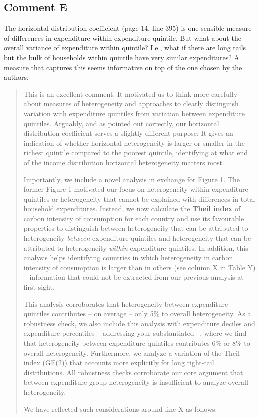 \documentclass[11pt]{article}
\newenvironment{response}
{\begin{quote}\color{black}}
{\end{quote}}
\begin{document}
\subsection*{Comment E}\label{comment_R1_E}

\begin{commentbox}
    The horizontal distribution coefficient (page 14, line 395) is one sensible measure of differences in expenditure within expenditure quintile. But what about the overall variance of expenditure within quintile? I.e., what if there are long tails but the bulk of households within quintile have very similar expenditures? A measure that captures this seems informative on top of the one chosen by the authors.
\end{commentbox}

\begin{response}

This is an excellent comment. It motivated us to think more carefully about measures of heterogeneity and approaches to clearly distinguish variation with expenditure quintiles from variation between expenditure quintiles. Arguably, and as pointed out correctly, our horizontal distribution coefficient serves a slightly different purpose: It gives an indication of whether horizontal heterogeneity is larger or smaller in the richest quintile compared to the poorest quintile, identifying at what end of the income distribution horizontal heterogeneity matters most.

Importantly, we include a novel analysis in exchange for Figure 1. The former Figure 1 motivated our focus on heterogeneity within expenditure quintiles or heterogeneity that cannot be explained with differences in total household expenditures. Instead, we now calculate the \textbf{Theil index} of carbon intensity of consumption for each country and use its favourable properties to distinguish between heterogeneity that can be attributed to heterogeneity \textit{between} expenditure quintiles and heterogeneity that can be attributed to heterogeneity \textit{within} expenditure quintiles. In addition, this analysis helps identifying countries in which heterogeneity in carbon intensity of consumption is larger than in others (see column X in Table Y) -- information that could not be extracted from our previous analysis at first sight.

This analysis corroborates that heterogeneity between expenditure quintiles contributes -- on average -- only 5\% to overall heterogeneity. As a robustness check, we also include this analysis with expenditure deciles and expenditure percentiles -- addressing your substantiated  --, where we find that heterogeneity between expenditure quintiles contributes 6\% or 8\% to overall heterogeneity. Furthermore, we analyze a variation of the Theil index (GE(2)) that accounts more explicitly for long right-tail distributions. All robustness checks corroborate our core argument that between expenditure group heterogeneity is insufficient to analyze overall heterogeneity.

We have reflected such considerations around line X as follows:

\end{response}
\end{document}
